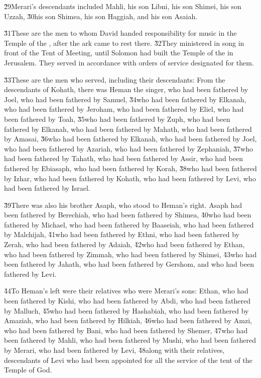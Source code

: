 \v{29}Merari's descendants included Mahli, his son Libni, his son Shimei, his son Uzzah, \v{30}his son Shimea, his son Haggiah, and his son Asaiah.

\v{31}These are the men to whom David handed responsibility for music in the Temple of the , after the ark came to rest there. \v{32}They ministered in song in front of the Tent of Meeting, until Solomon had built the Temple of the  in Jerusalem. They served in accordance with orders of service designated for them.

\v{33}These are the men who served, including their descendants: From the descendants of Kohath, there was Heman the singer, who had been fathered by Joel, who had been fathered by Samuel, \v{34}who had been fathered by Elkanah, who had been fathered by Jeroham, who had been fathered by Eliel, who had been fathered by Toah, \v{35}who had been fathered by Zuph, who had been fathered by Elkanah, who had been fathered by Mahath, who had been fathered by Amasai, \v{36}who had been fathered by Elkanah, who had been fathered by Joel, who had been fathered by Azariah, who had been fathered by Zephaniah, \v{37}who had been fathered by Tahath, who had been fathered by Assir, who had been fathered by Ebiasaph, who had been fathered by Korah, \v{38}who had been fathered by Izhar, who had been fathered by Kohath, who had been fathered by Levi, who had been fathered by Israel.

\v{39}There was also his brother Asaph, who stood to Heman's right. Asaph had been fathered by Berechiah, who had been fathered by Shimea, \v{40}who had been fathered by Michael, who had been fathered by Baaseiah, who had been fathered by Malchijah, \v{41}who had been fathered by Ethni, who had been fathered by Zerah, who had been fathered by Adaiah, \v{42}who had been fathered by Ethan, who had been fathered by Zimmah, who had been fathered by Shimei, \v{43}who had been fathered by Jahath, who had been fathered by Gershom, and who had been fathered by Levi.

\v{44}To Heman's left were their relatives who were Merari's sons: Ethan, who had been fathered by Kishi, who had been fathered by Abdi, who had been fathered by Malluch, \v{45}who had been fathered by Hashabiah, who had been fathered by Amaziah, who had been fathered by Hilkiah, \v{46}who had been fathered by Amzi, who had been fathered by Bani, who had been fathered by Shemer, \v{47}who had been fathered by Mahli, who had been fathered by Mushi, who had been fathered by Merari, who had been fathered by Levi, \v{48}along with their relatives, descendants of Levi who had been appointed for all the service of the tent of the Temple of God.

